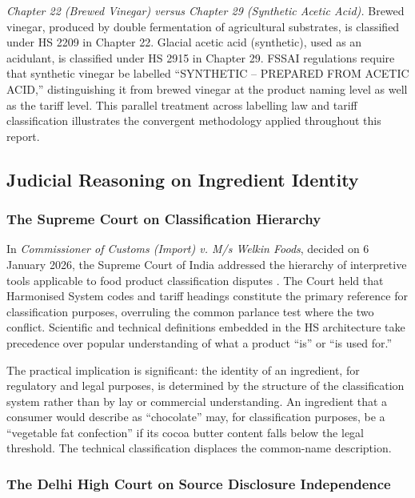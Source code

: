 \documentclass[12pt,a3paper]{article}
\begin{document}
\textit{Chapter 22 (Brewed Vinegar) versus Chapter 29 (Synthetic Acetic Acid).} Brewed vinegar, produced by double fermentation of agricultural substrates, is classified under HS 2209 in Chapter 22. Glacial acetic acid (synthetic), used as an acidulant, is classified under HS 2915 in Chapter 29. FSSAI regulations require that synthetic vinegar be labelled ``SYNTHETIC -- PREPARED FROM ACETIC ACID,'' distinguishing it from brewed vinegar at the product naming level as well as the tariff level. This parallel treatment across labelling law and tariff classification illustrates the convergent methodology applied throughout this report.

\subsection{Judicial Reasoning on Ingredient Identity}

\subsubsection{The Supreme Court on Classification Hierarchy}

In \textit{Commissioner of Customs (Import) v. M/s Welkin Foods}, decided on 6 January 2026, the Supreme Court of India addressed the hierarchy of interpretive tools applicable to food product classification disputes \cite{WelkinFoods_2026}. The Court held that Harmonised System codes and tariff headings constitute the primary reference for classification purposes, overruling the common parlance test where the two conflict. Scientific and technical definitions embedded in the HS architecture take precedence over popular understanding of what a product ``is'' or ``is used for.''

The practical implication is significant: the identity of an ingredient, for regulatory and legal purposes, is determined by the structure of the classification system rather than by lay or commercial understanding. An ingredient that a consumer would describe as ``chocolate'' may, for classification purposes, be a ``vegetable fat confection'' if its cocoa butter content falls below the legal threshold. The technical classification displaces the common-name description.

\subsubsection{The Delhi High Court on Source Disclosure Independence}
\end{document}
